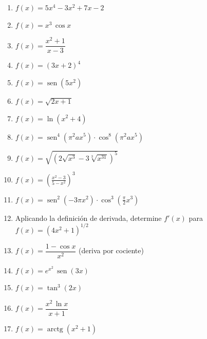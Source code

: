 \documentclass[12pt, letterpaper]{article}
\begin{document}
\begin{enumerate}[leftmargin=*]

  \item \medio{} $f(x) = 5x^4 - 3x^2 + 7x - 2$

  \item \medio{} $f(x) = x^3\,\cos x$

  \item \medio{} $f(x) = \dfrac{x^2 + 1}{x - 3}$

  \item \medio{} $f(x) = (3x + 2)^4$

  \item \medio{} $f(x) = \operatorname{sen}(5x^2)$

  \item \medio{} $f(x) = \sqrt{2x + 1}$

  \item \medio{} $f(x) = \ln(x^2 + 4)$

  \item \dificil{} $f(x) = \operatorname{sen}^4(\pi^2 a x^5)\cdot\cos^8(\pi^2 a x^5)$ %

  \item \dificil{} $f(x) = \sqrt{\left(2\sqrt{x^3} - 3\sqrt[3]{x^{31}}\right)^5}$ %

  \item \dificil{} $f(x) = \left(\frac{x^2 - 3}{5 - x^2}\right)^3$ %

  \item \dificil{} $f(x) = \operatorname{sen}^2(-3\pi x^2)\cdot\cos^3\left(\frac{\pi}{2}x^3\right)$ %

  \item \dificil{} Aplicando la definición de derivada, determine $f'(x)$ para $f(x) = (4x^2 + 1)^{1/2}$ %

  \item \dificil{} $f(x) = \dfrac{1 - \cos x}{x^2}$ (deriva por cociente)

  \item \dificil{} $f(x) = e^{x^2}\,\operatorname{sen}(3x)$

  \item \dificil{} $f(x) = \tan^3(2x)$

  \item \dificil{} $f(x) = \dfrac{x^2\,\ln x}{x + 1}$

  \item \dificil{} $f(x) = \operatorname{arctg}(x^2 + 1)$


\end{enumerate}
\end{document}
